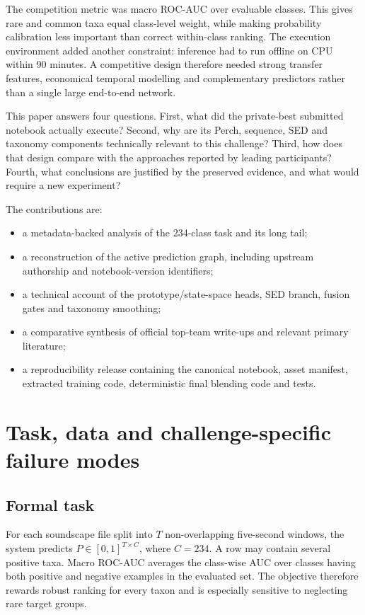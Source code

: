 \documentclass[10pt,a4paper]{article}
\begin{document}
The competition metric was macro ROC-AUC over evaluable classes. This gives rare and common taxa equal class-level weight, while making probability calibration less important than correct within-class ranking. The execution environment added another constraint: inference had to run offline on CPU within 90 minutes. A competitive design therefore needed strong transfer features, economical temporal modelling and complementary predictors rather than a single large end-to-end network.

This paper answers four questions. First, what did the private-best submitted notebook actually execute? Second, why are its Perch, sequence, SED and taxonomy components technically relevant to this challenge? Third, how does that design compare with the approaches reported by leading participants? Fourth, what conclusions are justified by the preserved evidence, and what would require a new experiment?

The contributions are:
\begin{itemize}
  \item a metadata-backed analysis of the 234-class task and its long tail;
  \item a reconstruction of the active prediction graph, including upstream authorship and notebook-version identifiers;
  \item a technical account of the prototype/state-space heads, SED branch, fusion gates and taxonomy smoothing;
  \item a comparative synthesis of official top-team write-ups and relevant primary literature;
  \item a reproducibility release containing the canonical notebook, asset manifest, extracted training code, deterministic final blending code and tests.
\end{itemize}

\section{Task, data and challenge-specific failure modes}
\subsection{Formal task}
For each soundscape file split into $T$ non-overlapping five-second windows, the system predicts $P\in[0,1]^{T\times C}$, where $C=234$. A row may contain several positive taxa. Macro ROC-AUC averages the class-wise AUC over classes having both positive and negative examples in the evaluated set. The objective therefore rewards robust ranking for every taxon and is especially sensitive to neglecting rare target groups.
\end{document}
